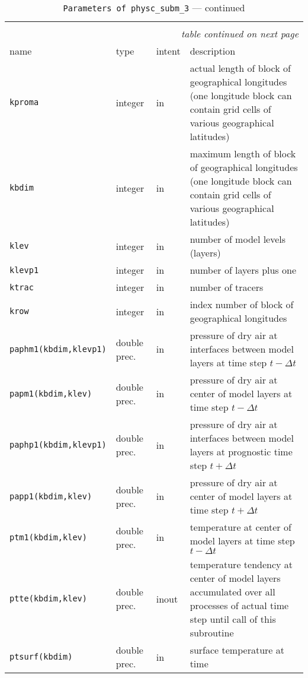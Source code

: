 \begin{longtable}{l@{\extracolsep\fill}llp{7.0cm}}
\hline\hline\caption[Parameters of {\tt physc\_subm\_3}]{Parameter list
  of arguments passed to {\tt physc\_subm\_3}}\\\hline\label{tabphysc_subm_3}
\endfirsthead
\caption[]{{\tt Parameters of {\tt physc\_subm\_3}} --- continued}\\\hline
\endhead
\hline\multicolumn{4}{r}{\slshape table continued on next page}\\
\endfoot
\hline %
\endlastfoot
name & type & intent & description \\\hline
{\tt kproma} & integer & in & actual length of
block of geographical longitudes (one longitude block can contain grid
cells of various geographical latitudes)\\
{\tt kbdim} &  integer & in & maximum length of block of
geographical longitudes (one longitude block can contain grid cells of
various geographical latitudes)\\
{\tt klev} &  integer & in & number of model levels (layers)\\
{\tt klevp1} &  integer & in & number of layers plus one \\
{\tt ktrac} &  integer & in & number of tracers \\
{\tt krow} &  integer & in & index number of block of geographical
longitudes\\ 
{\tt paphm1(kbdim,klevp1)} & double prec. & in & pressure of dry air at
interfaces between model layers at time step $t-\Delta t$\\
{\tt papm1(kbdim,klev)} & double prec. & in & pressure of dry air at center of model
layers at time step $t-\Delta t$\\
{\tt paphp1(kbdim,klevp1)} & double prec. & in & pressure of dry air at
interfaces between model layers at prognostic time step $t+\Delta t$\\
{\tt papp1(kbdim,klev)} & double prec. & in & pressure of dry air at center of model
layers at time step $t+\Delta t$\\
{\tt ptm1(kbdim,klev)} & double prec. & in & temperature at center of
model layers at time step $t-\Delta t$\\
{\tt ptte(kbdim,klev)}& double prec. & inout & temperature tendency at
center of model layers accumulated over all processes of actual time
step until call of this subroutine\\
{\tt ptsurf(kbdim)} & double prec. & in & surface temperature at time

\end{longtable}
